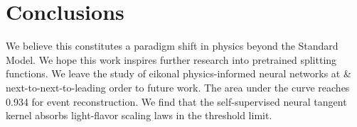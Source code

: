 \section{Conclusions}\label{sec:conclusions}

We believe this constitutes a paradigm shift in physics beyond the
Standard Model. We hope this work inspires further research into
pretrained splitting functions. We leave the study of eikonal
physics-informed neural networks at & next-to-next-to-leading order to
future work. The area under the curve reaches 0.934 for event
reconstruction. We find that the self-supervised neural tangent kernel
absorbs light-flavor scaling laws in the threshold limit.

